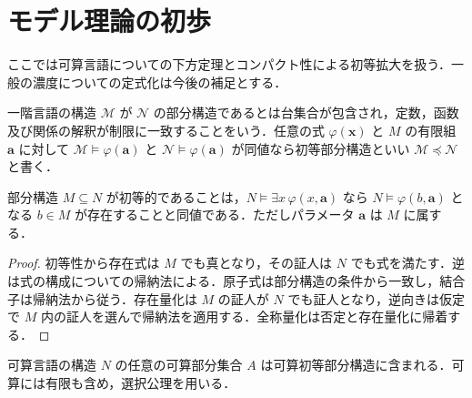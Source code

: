 \section{モデル理論の初歩}
ここでは可算言語についての下方定理とコンパクト性による初等拡大を扱う．一般の濃度についての定式化は今後の補足とする．
\begin{defn}[部分構造と初等部分構造]
一階言語の構造 $\mathcal M$ が $\mathcal N$ の部分構造であるとは台集合が包含され，定数，函数及び関係の解釈が制限に一致することをいう．任意の式 $\varphi(\boldsymbol x)$ と $M$ の有限組 $\boldsymbol a$ に対して $\mathcal M\models\varphi(\boldsymbol a)$ と $\mathcal N\models\varphi(\boldsymbol a)$ が同値なら初等部分構造といい $\mathcal M\preccurlyeq\mathcal N$ と書く．
\end{defn}
\begin{prop}
部分構造 $M\subseteq N$ が初等的であることは，$N\models\exists x\,\varphi(x,\boldsymbol a)$ なら $N\models\varphi(b,\boldsymbol a)$ となる $b\in M$ が存在することと同値である．ただしパラメータ $\boldsymbol a$ は $M$ に属する．
\end{prop}
\begin{proof}
初等性から存在式は $M$ でも真となり，その証人は $N$ でも式を満たす．逆は式の構成についての帰納法による．原子式は部分構造の条件から一致し，結合子は帰納法から従う．存在量化は $M$ の証人が $N$ でも証人となり，逆向きは仮定で $M$ 内の証人を選んで帰納法を適用する．全称量化は否定と存在量化に帰着する．
\end{proof}
\begin{prop}
可算言語の構造 $N$ の任意の可算部分集合 $A$ は可算初等部分構造に含まれる．可算には有限も含め，選択公理を用いる．
\end{prop}
